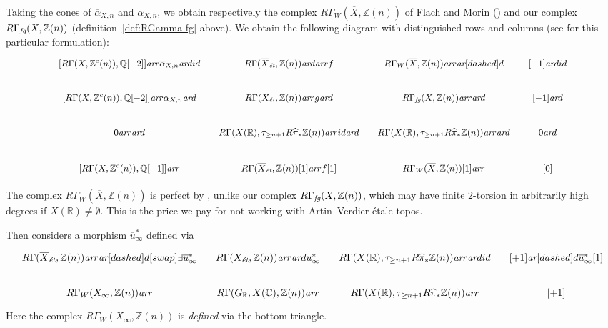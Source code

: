 \documentclass[leqno,12pt]{article}
\theoremstyle{plain}
\theoremstyle{definition}
\newcommand{\ZZ}{\mathbb{Z}}
\newcommand{\QQ}{\mathbb{Q}}
\newcommand{\RR}{\mathbb{R}}
\newcommand{\CC}{\mathbb{C}}
\newcommand{\et}{\text{\it \'{e}t}}
\newcommand{\fg}{\text{\it fg}}
\newcommand{\ar}{\text{\it ar}}
\begin{document}
Taking the cones of $\overline{\alpha}_{X,n}$ and $\alpha_{X,n}$, we obtain
respectively the complex $R\Gamma_W (\overline{X}, \ZZ (n))$ of Flach and Morin
(\cite[Definition~3.6]{Flach-Morin-2018}) and our complex
$R\Gamma_\fg (X, \ZZ(n))$ (definition~\ref{def:RGamma-fg} above). We obtain the
following diagram with distinguished rows and columns
(see \cite[Proposition~1.4.6]{Neeman-2001} for this particular formulation):
\begin{equation}
  \label{eqn:cones-of-alphas}
  \begin{tikzcd}[column sep=1em,font=\small]
    {[R\Gamma (X, \ZZ^c (n)), \QQ [-2]]} \ar{r}{\overline{\alpha}_{X,n}}\ar{d}{id} & R\Gamma (\overline{X}_\et, \ZZ(n))\ar{d}\ar{r}{f} & R\Gamma_W (\overline{X}, \ZZ(n)) \ar{r}\ar[dashed]{d} & {[-1]}\ar{d}{id} \\
    {[R\Gamma (X, \ZZ^c (n)), \QQ [-2]]} \ar{r}{\alpha_{X,n}}\ar{d} & R\Gamma (X_\et, \ZZ(n)) \ar{r}{g}\ar{d} & R\Gamma_\fg (X, \ZZ(n)) \ar{r}\ar{d} & {[-1]}\ar{d} \\
    0\ar{r}\ar{d} & R\Gamma (X (\RR), \tau_{\ge n+1} R \widehat{\pi}_* \ZZ (n)) \ar{r}{id}\ar{d} & R\Gamma (X (\RR), \tau_{\ge n+1} R \widehat{\pi}_* \ZZ (n)) \ar{r}\ar{d} & 0\ar{d} \\
    {[R\Gamma (X, \ZZ^c (n)), \QQ [-1]]} \ar{r} & R\Gamma (\overline{X}_\et, \ZZ(n))[1]\ar{r}{f[1]} & R\Gamma_W (\overline{X}, \ZZ(n))[1] \ar{r} & {[0]}
  \end{tikzcd}
\end{equation}

The complex $R\Gamma_W (\overline{X}, \ZZ(n))$ is perfect by
\cite[Proposition~3.8]{Flach-Morin-2018}, unlike our complex
$R\Gamma_\fg (X, \ZZ(n))$,
which may have finite $2$-torsion in arbitrarily high degrees if
$X (\RR) \ne \emptyset$. This is the price we pay for not working with
Artin--Verdier \'{e}tale topos.

Then \cite[Definition~3.23]{Flach-Morin-2018} considers a morphism
$\overline{u}^*_\infty$ defined via
\begin{equation}
  \label{eqn:definition-of-u-bar-infty}
  \begin{tikzcd}[column sep=1em]
    R\Gamma (\overline{X}_\et, \ZZ(n)) \ar{r}\ar[dashed]{d}[swap]{\exists}{\overline{u}_\infty^*} & R\Gamma (X_\et, \ZZ(n)) \ar{r}\ar{d}{u_\infty^*} & R\Gamma (X(\RR), \tau_{\ge n+1} R \widehat{\pi}_* \ZZ (n)) \ar{r}\ar{d}{id} & {[+1]} \ar[dashed]{d}{\overline{u}_\infty^* [1]} \\
    R\Gamma_W (X_\infty, \ZZ (n)) \ar{r} & R\Gamma (G_\RR, X (\CC), \ZZ (n)) \ar{r} & R\Gamma (X(\RR), \tau_{\ge n+1} R \widehat{\pi}_* \ZZ (n)) \ar{r} & {[+1]}
  \end{tikzcd}
\end{equation}
Here the complex $R\Gamma_W (X_\infty, \ZZ(n))$ is \emph{defined} via the bottom
triangle.
\end{document}
